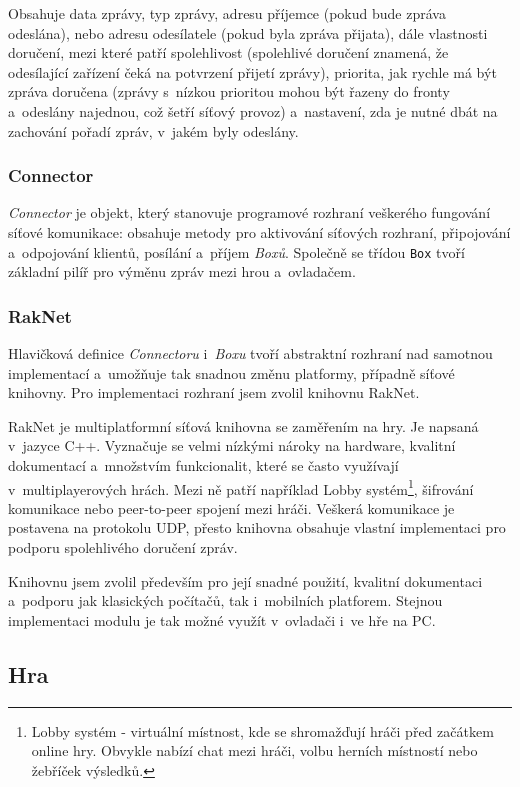 \documentclass[thesis=B,czech,hidelinks]{FITthesis}[2012/06/26] %
\newcommand{\code}[1]{\texttt{#1}}
\begin{document}
Obsahuje data zprávy, typ zprávy, adresu příjemce (pokud bude zpráva odeslána), nebo adresu odesílatele (pokud byla zpráva přijata), dále vlastnosti doručení, mezi které patří spolehlivost (spolehlivé doručení znamená, že odesílající zařízení čeká na potvrzení přijetí zprávy), priorita, jak rychle má být zpráva doručena (zprávy s~nízkou prioritou mohou být řazeny do fronty a~odeslány najednou, což šetří síťový provoz) a~nastavení, zda je nutné dbát na zachování pořadí zpráv, v~jakém byly odeslány.

\subsubsection{Connector}

\textit{Connector} je objekt, který stanovuje programové rozhraní veškerého fungování síťové komunikace: obsahuje metody pro aktivování síťových rozhraní, připojování a~odpojování klientů, posílání a~příjem \textit{Boxů}. Společně se třídou \code{Box} tvoří základní pilíř pro výměnu zpráv mezi hrou a~ovladačem.

\subsubsection{RakNet}

Hlavičková definice \textit{Connectoru} i~\textit{Boxu} tvoří abstraktní rozhraní nad samotnou implementací a~umožňuje tak snadnou změnu platformy, případně síťové knihovny. Pro implementaci rozhraní jsem zvolil knihovnu RakNet.

RakNet je multiplatformní síťová knihovna se zaměřením na hry. Je napsaná v~jazyce C++. Vyznačuje se velmi nízkými nároky na hardware, kvalitní dokumentací a~množstvím funkcionalit, které se často využívají v~multiplayerových hrách. \cite{raknet} Mezi ně patří například Lobby systém\footnote{Lobby systém - virtuální místnost, kde se shromažďují hráči před začátkem online hry. Obvykle nabízí chat mezi hráči, volbu herních místností nebo žebříček výsledků.}, šifrování komunikace nebo peer-to-peer spojení mezi hráči. Veškerá komunikace je postavena na protokolu UDP, přesto knihovna obsahuje vlastní implementaci pro podporu spolehlivého doručení zpráv.

Knihovnu jsem zvolil především pro její snadné použití, kvalitní dokumentaci a~podporu jak klasických počítačů, tak i~mobilních platforem. Stejnou implementaci modulu je tak možné využít v~ovladači i~ve hře na PC.

\subsection{Hra}
\end{document}
